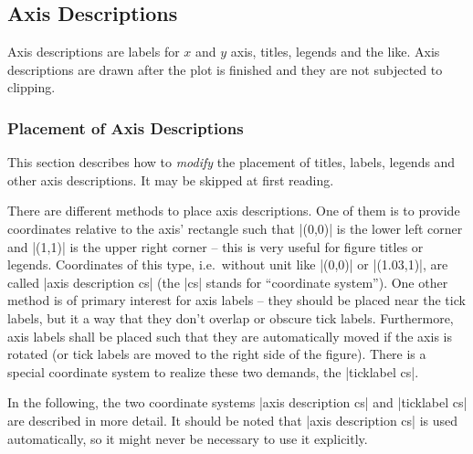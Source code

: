 
\subsection{Axis Descriptions}
Axis descriptions are labels for $x$ and $y$ axis, titles, legends and the like. Axis descriptions are drawn after the plot is finished and they are not subjected to clipping. 

\subsubsection{Placement of Axis Descriptions}
This section describes how to \emph{modify} the placement of titles, labels, legends and other axis descriptions. It may be skipped at first reading.

There are different methods to place axis descriptions. One of them is to provide coordinates relative to the axis' rectangle such that |(0,0)| is the lower left corner and |(1,1)| is the upper right corner -- this is very useful for figure titles or legends. Coordinates of this type, i.e.\ without unit like |(0,0)| or |(1.03,1)|, are called |axis description cs| (the |cs| stands for ``coordinate system''). One other method is of primary interest for axis labels -- they should be placed near the tick labels, but it a way that they don't overlap or obscure tick labels. Furthermore, axis labels shall be placed such that they are automatically moved if the axis is rotated (or tick labels are moved to the right side of the figure). There is a special coordinate system to realize these two demands, the |ticklabel cs|.

In the following, the two coordinate systems |axis description cs| and |ticklabel cs| are described in more detail. It should be noted that |axis description cs| is used automatically, so it might never be necessary to use it explicitly.


